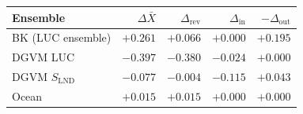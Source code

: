   \begin{tabular}{lrrrr}
    \hline
    Ensemble & $\Delta \bar X$ & $\Delta_{\mathrm{rev}}$ & $\Delta_{\mathrm{in}}$ & $-\Delta_{\mathrm{out}}$ \\
    \hline
    BK (LUC ensemble) & $+0.261$ & $+0.066$ & $+0.000$ & $+0.195$ \\
    DGVM LUC & $-0.397$ & $-0.380$ & $-0.024$ & $+0.000$ \\
    DGVM $S_{\mathrm{LND}}$ & $-0.077$ & $-0.004$ & $-0.115$ & $+0.043$ \\
    Ocean & $+0.015$ & $+0.015$ & $+0.000$ & $+0.000$ \\
    \hline
  \end{tabular}
